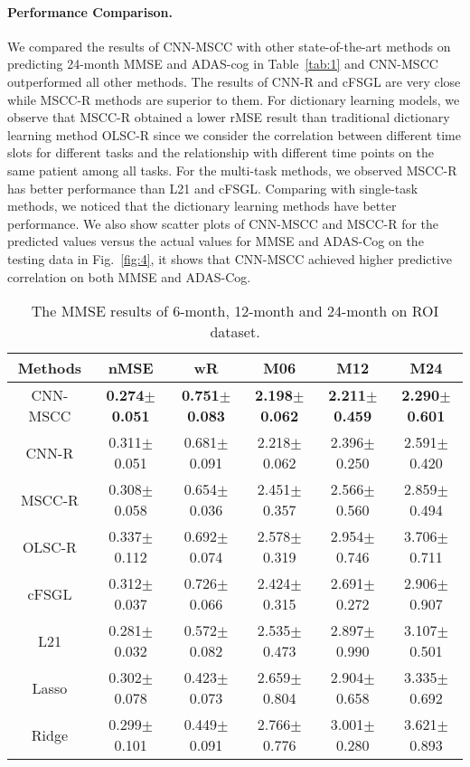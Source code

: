 \documentclass[10pt,twocolumn,letterpaper]{article}
\begin{document}
\paragraph{Performance Comparison.}
We compared the results of CNN-MSCC with other state-of-the-art methods on predicting 24-month MMSE and ADAS-cog in Table~\ref{tab:1} and CNN-MSCC outperformed all other methods. The results of CNN-R and cFSGL are very close while MSCC-R methods are superior to them. For dictionary learning models, we observe that MSCC-R obtained a lower rMSE result than traditional dictionary learning method OLSC-R since we consider the correlation between different time slots for different tasks and the relationship with different time points on the same patient among all tasks. For the multi-task methods, we observed MSCC-R has better performance than L21 and cFSGL. Comparing with single-task methods, we noticed that the dictionary learning methods have better performance.  We also show scatter plots of CNN-MSCC and MSCC-R for the predicted values versus the actual values for MMSE and ADAS-Cog on the testing data in Fig.~\ref{fig:4}, it shows that CNN-MSCC achieved higher predictive correlation on both MMSE and ADAS-Cog.

\begin{table*}[t]
\centering
\vspace{-1.3em}
\caption{The MMSE results of 6-month, 12-month and 24-month on ROI dataset.}
\vspace{-1em}
\label{tab:2}
\begin{tabular}{cccccc}
\toprule
Methods& nMSE & wR & M06 & M12 & M24\\\hline
CNN-MSCC & \textbf{0.274$\pm$0.051} & \textbf{0.751$\pm$0.083} & \textbf{2.198$\pm$0.062} & \textbf{2.211$\pm$0.459} & \textbf{2.290$\pm$0.601}\\
CNN-R & 0.311$\pm$0.051 & 0.681$\pm$0.091 & 2.218$\pm$0.062 & 2.396$\pm$0.250 & 2.591$\pm$0.420 \\
MSCC-R& 0.308$\pm$0.058 & 0.654$\pm$0.036 & 2.451$\pm$0.357 & 2.566$\pm$0.560 & 2.859$\pm$0.494\\
OLSC-R & 0.337$\pm$0.112 & 0.692$\pm$0.074 & 2.578$\pm$0.319 & 2.954$\pm$0.746 & 3.706$\pm$0.711 \\
cFSGL& 0.312$\pm$0.037 & 0.726$\pm$0.066 & 2.424$\pm$0.315 & 2.691$\pm$0.272 & 2.906$\pm$0.907\\
L21&0.281$\pm$0.032&0.572$\pm$0.082&2.535$\pm$0.473&2.897$\pm$0.990&3.107$\pm$0.501\\
Lasso&0.302$\pm$0.078&0.423$\pm$0.073&2.659$\pm$0.804&2.904$\pm$0.658&3.335$\pm$0.692\\
Ridge&0.299$\pm$0.101&0.449$\pm$0.091&2.766$\pm$0.776&3.001$\pm$0.280&3.621$\pm$0.893\\
\bottomrule
\end{tabular}
\end{table*}
\end{document}
